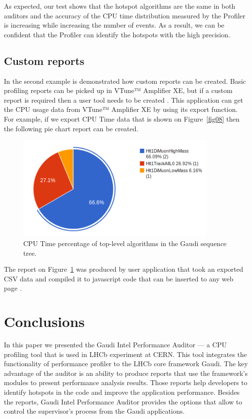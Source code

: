 \documentclass[a4paper]{jpconf}
\begin{document}
As expected, our test shows that the hotspot algorithms are the same in both auditors and the accuracy of the CPU time distribution measured by the Profiler is increasing while increasing the number of events. As a result, we can be confident that the Profiler can identify the hotspots with the high precision.

\subsection{Custom reports}

In the second example is demonstrated how custom reports can be created. Basic profiling reports can be picked up in VTune™ Amplifier XE, but if a custom report is required then a user tool needs to be created . This application can get the CPU usage data from VTune™ Amplifier XE by using its export function. For example, if we export CPU Time data that is shown on Figure~\ref{fig08} then the following pie chart report can be created.

\begin{figure}[H]
\begin{minipage}{\textwidth}
\begin{center}
\includegraphics[width=100mm]{figs/fig12.png}
\caption{\label{fig12}CPU Time percentage of top-level algorithms in the Gaudi sequence tree.}
\end{center}
\end{minipage}
\end{figure}

The report on Figure~\ref{fig12} was produced by user application that took an exported CSV data and compiled it to javascript code that can be inserted to any web page \cite{reports}.

\section{Conclusions}
In this paper we presented the Gaudi Intel Performance Auditor --- a CPU profiling tool that is used in LHCb experiment at CERN. This tool integrates the functionality of \iamp performance profiler to the LHCb core framework Gaudi. The key advantage of the auditor is an ability to produce reports that use the framework’s modules to present performance analysis results. Those reports help  developers to identify hotspots in the code and improve the application performance. Besides the reports, Gaudi Intel Performance Auditor provides the options that allow to control the \iamp supervisor’s process from the Gaudi applications.
\end{document}
